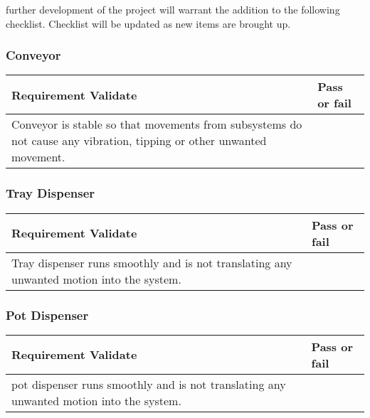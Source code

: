 \documentclass[12pt, titlepage]{article}
\begin{document}
 further development of the project will warrant the addition to the following checklist. Checklist will be updated as new items are brought up.

 \subsubsection{Conveyor}
 \begin{center}
  \begin{tabular}{ |m{10cm}|m{3cm}| } 
    \hline
    \textbf{Requirement Validate} & \textbf{Pass or fail } \\ 
    \hline
    Conveyor is stable so that movements from subsystems do not cause any vibration, tipping or other unwanted movement. & \\

    \hline
  \end{tabular}
\end{center}

\subsubsection{Tray Dispenser}
\begin{center}
 \begin{tabular}{ |m{10cm}|m{3.2cm}| } 
   \hline
   \textbf{Requirement Validate} & \textbf{Pass or fail } \\ 
   \hline
   Tray dispenser runs smoothly and is not translating any unwanted motion into the system. & \\

   \hline
 \end{tabular}
\end{center}

\subsubsection{Pot Dispenser}
\begin{center}
 \begin{tabular}{ |m{10cm}|m{3cm}| } 
   \hline
   \textbf{Requirement Validate} & \textbf{Pass or fail } \\ 
   \hline
   pot dispenser runs smoothly and is not translating any unwanted motion into the system. & \\
  
   \hline
 \end{tabular}
\end{center}
\end{document}
